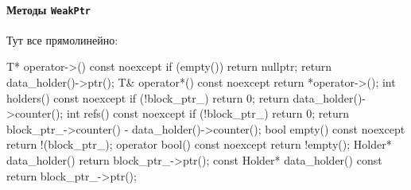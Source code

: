 \paragraph{Методы \texttt{WeakPtr}}

Тут все прямолинейно:
\begin{cppcode}
T* operator->() const noexcept {
  if (empty())
    return nullptr;
  return data_holder()->ptr();
}
T& operator*() const noexcept {
  return *operator->();
}
int holders() const noexcept {
  if (!block_ptr_)
    return 0;
  return data_holder()->counter();
}
int refs() const noexcept {
  if (!block_ptr_)
    return 0;
  return block_ptr_->counter() - data_holder()->counter();
}
bool empty() const noexcept {
  return !(block_ptr_);
}
operator bool() const noexcept {
  return !empty();
}
Holder* data_holder() {
  return block_ptr_->ptr();
}
const Holder* data_holder() const {
  return block_ptr_->ptr();
}
\end{cppcode}


